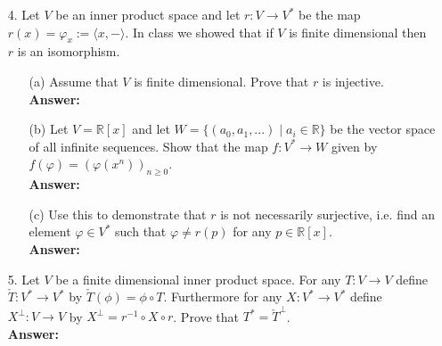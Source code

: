 \documentclass{article}
\begin{document}
\begin{itemize}
\begin{itemize}
	\end{itemize}
	\item [4.] Let $V$ be an inner product space and let $r:V\rightarrow V^*$ be the map $r(x)=\varphi_x:=\langle x,-\rangle$. In class we showed that if $V$ is finite dimensional then $r$ is an isomorphism.
	\begin{itemize}
		\item [(a)] Assume that $V$ is finite dimensional. Prove that $r$ is injective.\\
		\textbf{Answer: }
		\item [(b)] Let $V=\mathbb{R}[x]$ and let $W=\{(a_0,a_1,...)\mid a_i\in\mathbb{R}\}$ be the vector space of all infinite sequences. Show that the map $\mathit{f}:V^*\rightarrow W$ given by $\mathit{f}(\varphi)=(\varphi(x^n))_{n\geq 0}$.\\
		\textbf{Answer: }
		\item [(c)] Use this to demonstrate that $r$ is not necessarily surjective, i.e. find an element $\varphi\in V^*$ such that $\varphi\neq r(p)$ for any $p\in\mathbb{R}[x]$.\\
		\textbf{Answer: }
	\end{itemize}
	\item [5.] Let $V$ be a finite dimensional inner product space. For any $T:V\rightarrow V$ define $\check{T}:V^*\rightarrow V^*$ by $\check{T}(\phi)=\phi\circ T$. Furthermore for any $X:V^*\rightarrow V^*$ define $X^\perp:V\rightarrow V$ by $X^\perp=r^{-1}\circ X\circ r$. Prove that $T^*=\check{T}^\perp$.\\
	\textbf{Answer: }
\end{itemize}
\end{document}
